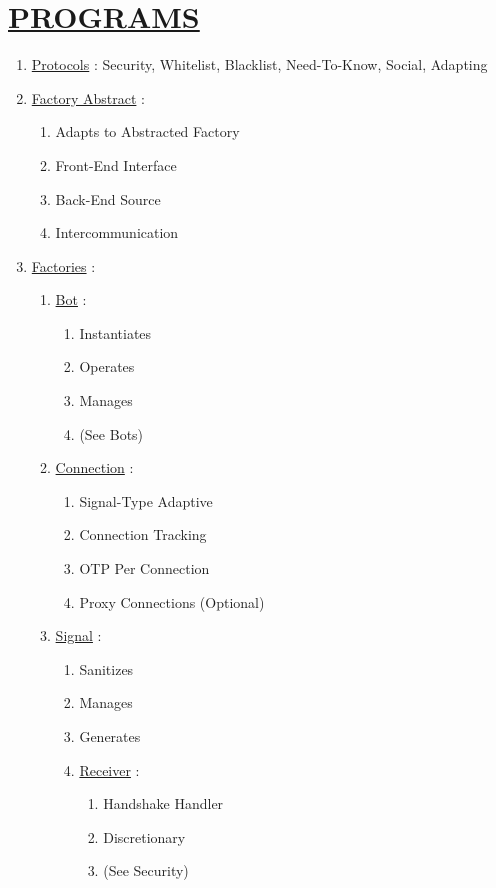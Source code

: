 \documentclass[11pt]{article}
\begin{document}
\section*{\ul{PROGRAMS}}
\begin{enumerate}
	\item[] \ul{Protocols} : Security, Whitelist, Blacklist, Need-To-Know, Social, Adapting
	
	\item[] \ul{Factory Abstract} :
	\begin{enumerate}
		\item[] Adapts to Abstracted Factory
		\item[] Front-End Interface
		\item[] Back-End Source
		\item[] Intercommunication
	\end{enumerate}
	
	\item[] \ul{Factories} :
	\begin{enumerate}
		\item[] \ul{Bot} :
		\begin{enumerate}
			\item[] Instantiates
			\item[] Operates
			\item[] Manages
			\item[] (See Bots)
		\end{enumerate}
		
		\item[] \ul{Connection} :
		\begin{enumerate}
			\item[] Signal-Type Adaptive
			\item[] Connection Tracking
			\item[] OTP Per Connection
			\item[] Proxy Connections (Optional)
		\end{enumerate}
		
		\item[] \ul{Signal} :
		\begin{enumerate}
			\item[] Sanitizes
			\item[] Manages
			\item[] Generates
			
			\item[] \ul{Receiver}  :
			\begin{enumerate}
				\item[] Handshake Handler
				\item[] Discretionary
				\item[] (See Security)
			\end{enumerate}
			

\end{enumerate}
\end{enumerate}
\end{enumerate}
\end{document}
